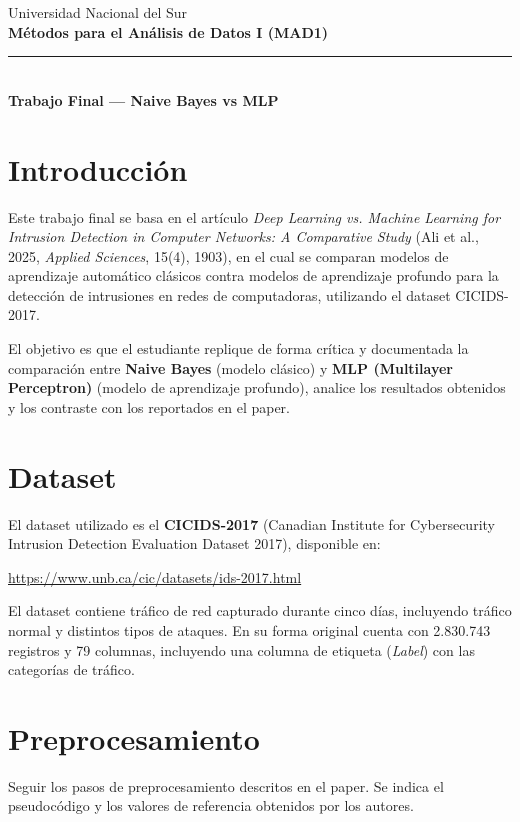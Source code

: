 \documentclass[11pt,a4paper]{article}
\begin{document}
\begin{center}
    {\color{azulUNS}\small Universidad Nacional del Sur}\\[2pt]
    {\color{azulUNS}\Large\bfseries M\'etodos para el An\'alisis de Datos I (MAD1)}\\[6pt]
    {\color{azulUNS}\rule{\textwidth}{1.2pt}}\\[8pt]
    {\Large\bfseries Trabajo Final --- Naive Bayes vs MLP}
\end{center}

\vspace{1em}

\section{Introducci\'on}
Este trabajo final se basa en el art\'iculo \textit{Deep Learning vs. Machine Learning for Intrusion Detection in Computer Networks: A Comparative Study} (Ali et al., 2025, \textit{Applied Sciences}, 15(4), 1903), en el cual se comparan modelos de aprendizaje autom\'atico cl\'asicos contra modelos de aprendizaje profundo para la detecci\'on de intrusiones en redes de computadoras, utilizando el dataset CICIDS-2017.

El objetivo es que el estudiante replique de forma cr\'itica y documentada la comparaci\'on entre \textbf{Naive Bayes} (modelo cl\'asico) y \textbf{MLP (Multilayer Perceptron)} (modelo de aprendizaje profundo), analice los resultados obtenidos y los contraste con los reportados en el paper.

\section{Dataset}
El dataset utilizado es el \textbf{CICIDS-2017} (Canadian Institute for Cybersecurity Intrusion Detection Evaluation Dataset 2017), disponible en:
\begin{center}
\url{https://www.unb.ca/cic/datasets/ids-2017.html}
\end{center}
El dataset contiene tr\'afico de red capturado durante cinco d\'ias, incluyendo tr\'afico normal y distintos tipos de ataques. En su forma original cuenta con 2.830.743 registros y 79 columnas, incluyendo una columna de etiqueta (\textit{Label}) con las categor\'ias de tr\'afico.

\section{Preprocesamiento}
Seguir los pasos de preprocesamiento descritos en el paper. Se indica el pseudoc\'odigo y los valores de referencia obtenidos por los autores.
\end{document}
